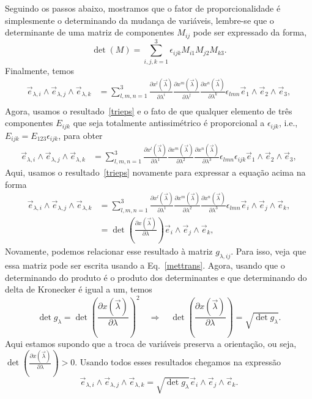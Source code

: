 Seguindo os passos abaixo, mostramos que o fator de proporcionalidade é
simplesmente o determinando da mudança de variáveis, lembre-se que o determinante de uma matriz de componentes $M_{ij}$ pode ser expressado da forma,
\begin{equation}
	\det(M) = \sum_{i,j,k=1}^3\epsilon_{ijk}M_{i1}M_{j2}M_{k3}.
\end{equation}
Finalmente, temos
\begin{align}
	\nonumber \vec{e}_{\lambda,i}\wedge\vec{e}_{\lambda,j}\wedge\vec{e}_{\lambda,k} & =\sum_{l,m,n=1}^3\frac{\partial x^l(\vec{\lambda})}{\partial \lambda^i}\frac{\partial x^m(\vec{\lambda})}{\partial \lambda^j}\frac{\partial x^n(\vec{\lambda})}{\partial \lambda^k}\epsilon_{lmn}\vec{e}_1\wedge\vec{e}_2\wedge\vec{e}_3, \\
\end{align}
Agora, usamos o resultado~\eqref{trieps} e o fato de que qualquer elemento de
três componentes $E_{ijk}$ que seja totalmente antissimétrico é proporcional a
$\epsilon_{ijk}$, i.e., $E_{ijk} = E_{123}\epsilon_{ijk}$, para obter
\begin{align}
	\nonumber \vec{e}_{\lambda,i}\wedge\vec{e}_{\lambda,j}\wedge\vec{e}_{\lambda,k} & =\sum_{l,m,n=1}^3\frac{\partial x^l(\vec{\lambda})}{\partial \lambda^1}\frac{\partial x^m(\vec{\lambda})}{\partial \lambda^2}\frac{\partial x^n(\vec{\lambda})}{\partial \lambda^3}\epsilon_{lmn}\epsilon_{ijk}\vec{e}_1\wedge\vec{e}_2\wedge\vec{e}_3,
\end{align}
Aqui, usamos o resultado~\eqref{trieps} novamente para expressar a equação acima
na forma
\begin{align}
	\nonumber \vec{e}_{\lambda,i}\wedge\vec{e}_{\lambda,j}\wedge\vec{e}_{\lambda,k} & =\sum_{l,m,n=1}^3\frac{\partial x^l(\vec{\lambda})}{\partial \lambda^1}\frac{\partial x^m(\vec{\lambda})}{\partial \lambda^2}\frac{\partial x^n(\vec{\lambda})}{\partial \lambda^3}\epsilon_{lmn}\vec{e}_i\wedge\vec{e}_j\wedge\vec{e}_k, \\
	                                                                                & = \det\left(\frac{\partial x(\vec{\lambda})}{\partial \lambda}\right)\vec{e}_i\wedge\vec{e}_j\wedge\vec{e}_k,
\end{align}
Novamente, podemos
relacionar esse resultado à matriz $g_{\lambda,ij}$. Para isso, veja que essa
matriz pode ser escrita usando a Eq.~\eqref{mettrans}. Agora, usando que o
determinando do produto é o produto dos determinantes e que determinando do
delta de Kronecker é igual a um, temos
\begin{equation}
	\det g_{\lambda} = \det\left(\frac{\partial x(\vec{\lambda})}{\partial \lambda}\right)^2\quad\Rightarrow\quad \det\left(\frac{\partial x(\vec{\lambda})}{\partial \lambda}\right) = \sqrt{\det g_{\lambda}}.
\end{equation}
Aqui estamos supondo que a troca de variáveis preserva a orientação, ou seja,
$\det\left(\frac{\partial x(\vec{\lambda})}{\partial \lambda}\right)>0$.
Usando todos esses resultados chegamos na expressão
\begin{equation}
	\vec{e}_{\lambda,i}\wedge\vec{e}_{\lambda,j}\wedge\vec{e}_{\lambda,k} = \sqrt{\det g_{\lambda}}\vec{e}_i\wedge\vec{e}_j\wedge\vec{e}_k.
\end{equation}

